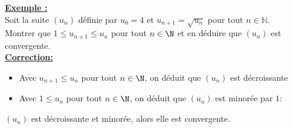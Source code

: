 \documentclass[11pt,twoside, openany]{extbook}
\begin{document}
\medskip
\noindent \textbf{\ul{Exemple :}}\\Soit la suite $(u_n)$ définie par $u_0=4$ et $u_{n+1}=\sqrt{u_n}$ pour tout $n\in\mathbb{N}$.\\
Montrer que $1\leqslant u_{n+1}\leqslant u_n$ pour tout $n\in\N$ et en déduire que $(u_n)$ est convergente.\\
\noindent \textbf{\ul{Correction:}}
\begin{itemize}
    \item Avec $u_{n+1}\leqslant u_{n}$ pour tout $n\in\N$, on déduit que $(u_n)$ est décroissante
    \item Avec $1\leqslant u_{n}$ pour tout ${n\in\N}$, on déduit que $(u_n)$ est minorée par $1$:
\end{itemize}
$(u_n)$ est décroissante et minorée, alors elle est convergente.
\newpage
\end{document}

